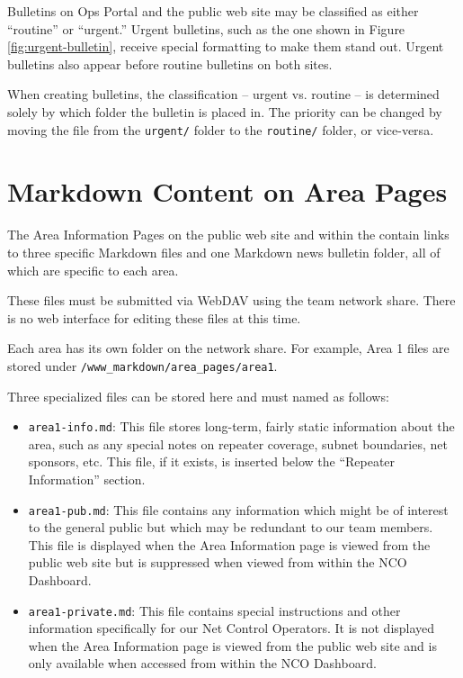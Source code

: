 \documentclass[pdflatex,letterpaper,twoside,12pt]{book}
\begin{document}
Bulletins on Ops Portal and the public web site may be classified as either ``routine'' or ``urgent.''  Urgent bulletins, such as the one shown in Figure \ref{fig:urgent-bulletin}, receive special formatting to make them stand out.  Urgent bulletins also appear before routine bulletins on both sites.

When creating bulletins, the classification -- urgent vs. routine -- is determined solely by which folder the bulletin is placed in.  The priority can be changed by moving the file from the \texttt{urgent/} folder to the \texttt{routine/} folder, or vice-versa.


\section{Markdown Content on Area Pages}

The Area Information Pages on the public web site and within the  contain links to three specific Markdown files and one Markdown news bulletin folder, all of which are specific to each area.

These files must be submitted via WebDAV using the team network share.  There is no web interface for editing these files at this time.

Each area has its own folder on the network share.  For example, Area 1 files are stored under \texttt{/www\_markdown/area\_pages/area1}.

Three specialized files can be stored here and must named as follows:

\begin{itemize}
\item \texttt{area1-info.md}: This file stores long-term, fairly static information about the area, such as any special notes on repeater coverage, subnet boundaries, net sponsors, etc.  This file, if it exists, is inserted below the ``Repeater Information'' section.
\item \texttt{area1-pub.md}: This file contains any information which might be of interest to the general public but which may be redundant to our team members.  This file is displayed when the Area Information page is viewed from the public web site but is suppressed when viewed from within the NCO Dashboard.
\item \texttt{area1-private.md}:  This file contains special instructions and other information specifically for our Net Control Operators.  It is not displayed when the Area Information page is viewed from the public web site and is only available when accessed from within the NCO Dashboard.
\end{itemize}
\end{document}
